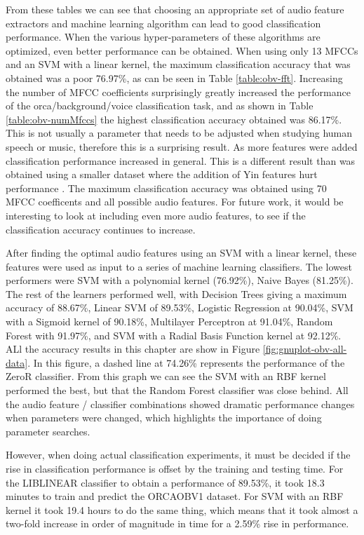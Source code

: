 From these tables we can see that choosing an appropriate set of audio
feature extractors and machine learning algorithm can lead to good
classification performance.  When the various hyper-parameters of
these algorithms are optimized, even better performance can be
obtained.  When using only 13 MFCCs and an SVM with a linear kernel,
the maximum classification accuracy that was obtained was a poor
76.97\%, as can be seen in Table \ref{table:obv-fft}.  Increasing the
number of MFCC coefficients surprisingly greatly increased the
performance of the orca/background/voice classification task, and as
shown in Table \ref{table:obv-numMfccs} the highest classification
accuracy obtained was 86.17\%.  This is not usually a parameter that
needs to be adjusted when studying human speech or music, therefore this is a
surprising result.  As more features were added classification
performance increased in general.  This is a different result than was
obtained using a smaller dataset where the addition of Yin features
hurt performance \cite{ness2008chants}.  The maximum classification
accuracy was obtained using 70 MFCC coefficents and all possible audio
features.  For future work, it would be interesting to look at
including even more audio features, to see if the classification
accuracy continues to increase.

After finding the optimal audio features using an SVM with a linear
kernel, these features were used as input to a series of machine
learning classifiers.  The lowest performers were SVM with a
polynomial kernel (76.92\%), Naive Bayes (81.25\%).  The rest of the
learners performed well, with Decision Trees giving a maximum accuracy
of 88.67\%, Linear SVM of 89.53\%, Logistic Regression at 90.04\%, SVM
with a Sigmoid kernel of 90.18\%, Multilayer Perceptron at 91.04\%,
Random Forest with 91.97\%, and SVM with a Radial Basis Function
kernel at 92.12\%.  ALl the accuracy results in this chapter are
show in Figure \ref{fig:gnuplot-obv-all-data}.  In this figure, a
dashed line at 74.26\% represents the performance of the ZeroR
classifier.  From this graph we can see the SVM with an RBF kernel
performed the best, but that the Random Forest classifier was close
behind.  All the audio feature / classifier combinations showed
dramatic performance changes when parameters were changed, which
highlights the importance of doing parameter searches.

However, when doing actual classification experiments, it must be
decided if the rise in classification performance is offset by the
training and testing time.  For the LIBLINEAR classifier to obtain a
performance of 89.53\%, it took 18.3 minutes to train and predict the
ORCAOBV1 dataset.  For SVM with an RBF kernel it took 19.4 hours to do
the same thing, which means that it took almost a two-fold increase in
order of magnitude in time for a 2.59\% rise in performance.


